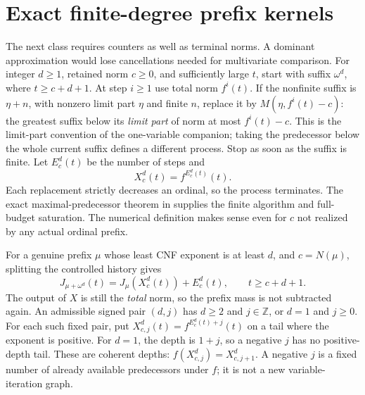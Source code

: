 \documentclass[11pt]{article}
\begin{document}
\section{Exact finite-degree prefix kernels}
The next class requires counters as well as terminal norms. A dominant
approximation would lose cancellations needed for multivariate comparison.
For integer $d\ge1$, retained norm $c\ge0$, and sufficiently large $t$, start
with suffix $\omega^d$, where $t\ge c+d+1$. At step $i\ge1$ use total
norm $f^i(t)$. If the nonfinite suffix is $\eta+n$, with nonzero limit
part $\eta$ and finite $n$, replace it by $M(\eta,f^i(t)-c)$: the greatest
suffix below its \emph{limit part} of norm at most $f^i(t)-c$.
This is the limit-part convention of the one-variable companion; taking
the predecessor below the whole current suffix defines a different process.
Stop as soon as the suffix is finite. Let $E^d_c(t)$ be the number of
steps and
\[
 X^d_c(t)=f^{E^d_c(t)}(t).
\]
Each replacement strictly decreases an ordinal, so the process terminates.
The exact maximal-predecessor theorem in \cite{wwfoundations} supplies the
finite algorithm and full-budget saturation. The numerical definition makes
sense even for $c$ not realized by any actual ordinal prefix.

For a genuine prefix $\mu$ whose least CNF exponent is at least $d$, and
$c=N(\mu)$, splitting the controlled history gives
\begin{equation}\label{eq:prefix}
 J_{\mu+\omega^d}(t)=J_\mu(X^d_c(t))+E^d_c(t),
       \qquad t\ge c+d+1.
\end{equation}
The output of $X$ is still the \emph{total} norm, so the prefix mass is not
subtracted again. An admissible signed pair $(d,j)$ has $d\ge2$ and
$j\in\mathbb Z$, or $d=1$ and $j\ge0$. For each such fixed pair, put
$X^d_{c,j}(t)=f^{E^d_c(t)+j}(t)$ on a tail where the exponent is positive.
For $d=1$, the depth is $1+j$, so a negative $j$ has no positive-depth tail.
These are coherent depths: $f(X^d_{c,j})=X^d_{c,j+1}$. A negative $j$ is a
fixed number of already available predecessors under $f$; it is not a new
variable-iteration graph.
\end{document}

